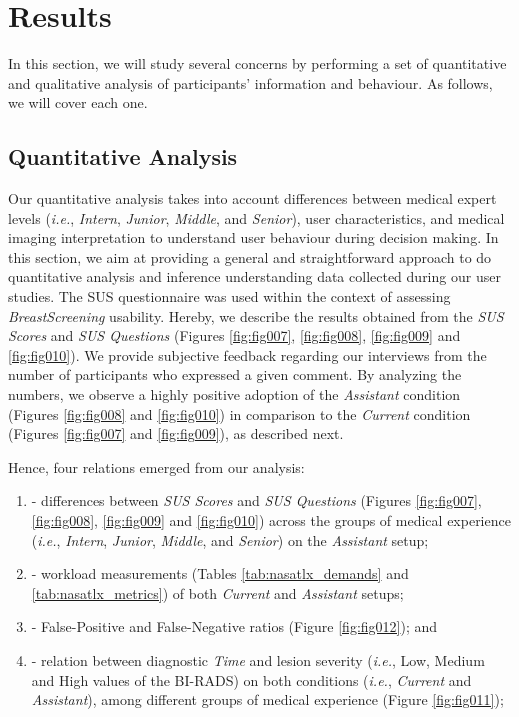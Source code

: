\section{Results}
\label{sec:results}

In this section, we will study several concerns by performing a set of quantitative and qualitative analysis of participants' information and behaviour.
As follows, we will cover each one.

\subsection{Quantitative Analysis}
\label{sec:quantitative}

Our quantitative analysis takes into account differences between medical expert levels ({\em i.e.}, {\it Intern}, {\it Junior}, {\it Middle}, and {\it Senior}), user characteristics, and medical imaging interpretation to understand user behaviour during decision making.
In this section, we aim at providing a general and straightforward approach to do quantitative analysis  and inference understanding data collected during our user studies.
The SUS questionnaire was used within the context of assessing {\it BreastScreening} usability.
Hereby, we describe the results obtained from the {\it SUS Scores} and {\it SUS Questions} (Figures \ref{fig:fig007}, \ref{fig:fig008}, \ref{fig:fig009} and \ref{fig:fig010}).
We provide subjective feedback regarding our interviews from the number of participants who expressed a given comment.
By analyzing the numbers, we observe a highly positive adoption of the {\it Assistant} condition (Figures \ref{fig:fig008} and \ref{fig:fig010}) in comparison to the {\it Current} condition (Figures \ref{fig:fig007} and \ref{fig:fig009}), as described next.

\hfill

\noindent
Hence, four relations emerged from our analysis:

\begin{enumerate}[label=\alph*]
\item - differences between {\it SUS Scores} and {\it SUS Questions} (Figures \ref{fig:fig007}, \ref{fig:fig008}, \ref{fig:fig009} and \ref{fig:fig010}) across the groups of medical experience ({\em i.e.}, {\it Intern}, {\it Junior}, {\it Middle}, and {\it Senior}) on the {\it Assistant} setup;
\item - workload measurements (Tables \ref{tab:nasatlx_demands} and \ref{tab:nasatlx_metrics}) of both {\it Current} and {\it Assistant} setups;
\item - False-Positive and False-Negative ratios (Figure \ref{fig:fig012}); and
\item - relation between diagnostic {\it Time} and lesion severity ({\it i.e.}, Low, Medium and High values of the BI-RADS) on both conditions ({\it i.e.}, {\it Current} and {\it Assistant}), among different groups of medical experience (Figure \ref{fig:fig011});
\end{enumerate}

